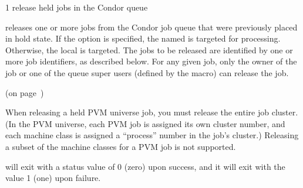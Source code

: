 \begin{ManPage}{\label{man-condor-release}}{1}
{release held jobs in the Condor queue}
\Synopsis {}
\ToolArgsBase 
\ToolLocate
\ToolJobs

\ToolArgsBase 
\ToolLocate
\ToolAll


\Description

 releases one or more jobs from the Condor job queue that were 
previously placed in hold state.  
If the  option is specified, the named  is targeted
for processing.  
Otherwise, the local  is targeted.
The jobs to be released are identified by one or more job identifiers, as
described below.
For any given job, only the owner of the job or one of the queue super users
(defined by the  macro) can release the job.

\begin{Options}
	\ToolArgsBaseDesc
	\ToolLocateDesc
\end{Options}

\SeeAlso
{} (on page~\pageref{man-condor-hold})

\GenRem

When releasing a held PVM universe job, you must release the entire
job cluster.  (In the PVM universe, each PVM job is assigned its own
cluster number, and each machine class is assigned a ``process''
number in the job's cluster.)  Releasing a subset of the machine
classes for a PVM job is not supported.

\ExitStatus

 will exit with a status value of 0 (zero) upon success,
and it will exit with the value 1 (one) upon failure.

\end{ManPage}
